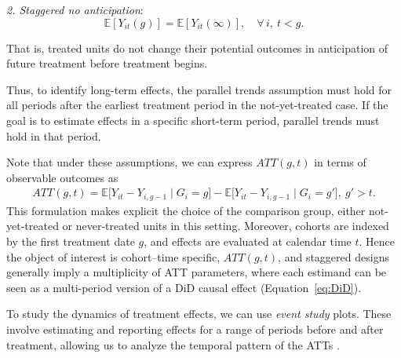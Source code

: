 \textit{2. Staggered no anticipation}:
\begin{equation*}
	\mathbb{E}[Y_{it}(g)] = \mathbb{E}[Y_{it}(\infty)], \quad \forall\, i,\ t < g.
\end{equation*}

That is, treated units do not change their potential outcomes in anticipation of future treatment before treatment begins.

Thus, to identify long-term effects, the parallel trends assumption must hold for all periods after the earliest treatment period in the not-yet-treated case. If the goal is to estimate effects in a specific short-term period, parallel trends must hold in that period.

Note that under these assumptions, we can express $ATT(g,t)$ in terms of observable outcomes as \cite{roth2023whats}
\begin{align*}
	ATT(g,t) 
	= \mathbb{E}\big[ Y_{it} - Y_{i, g-1} \mid G_i = g \big]
	- \mathbb{E}\big[ Y_{it} - Y_{i, g-1} \mid G_i = g'\big], \ g' > t.
\end{align*}
This formulation makes explicit the choice of the comparison group, either not-yet-treated or never-treated units in this setting. Moreover, cohorts are indexed by the first treatment date $g$, and effects are evaluated at calendar time $t$. Hence the object of interest is cohort–time specific, $ATT(g,t)$, and staggered designs generally imply a multiplicity of ATT parameters, where each estimand can be seen as a multi-period version of a DiD causal effect (Equation~\ref{eq:DiD}).

To study the dynamics of treatment effects, we can use \textit{event study} plots. These involve estimating and reporting effects for a range of periods before and after treatment, allowing us to analyze the temporal pattern of the ATTs \cite{baker2025did_guide}. 

